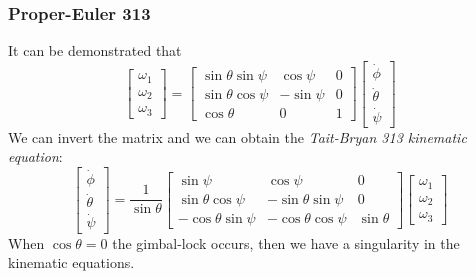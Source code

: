 \subsubsection{Proper-Euler 313}
It can be demonstrated that
\begin{equation}
        \begin{bmatrix}
            \omega_1\\
            \omega_2\\
            \omega_3
        \end{bmatrix} = 
        \begin{bmatrix}
           \sin\theta\sin\psi&\cos\psi&0\\
           \sin\theta\cos\psi&-\sin\psi&0\\
           \cos\theta&0&1
        \end{bmatrix}
        \begin{bmatrix}
            \dot{\phi}\\
            \dot{\theta}\\
            \dot{\psi}
        \end{bmatrix}
\end{equation}
We can invert the matrix and we can obtain the \textit{Tait-Bryan 313 kinematic equation}:
\begin{equation}
    \begin{bmatrix}
        \dot{\phi}\\
        \dot{\theta}\\
        \dot{\psi}
    \end{bmatrix}=\frac{1}{\sin\theta}\begin{bmatrix}
        \sin\psi&\cos\psi&0\\
        \sin\theta\cos\psi&-\sin\theta\sin\psi&0\\
        -\cos\theta\sin\psi&-\cos\theta\cos\psi&\sin\theta
    \end{bmatrix}\begin{bmatrix}
        \omega_1\\
        \omega_2\\
        \omega_3
    \end{bmatrix}
\end{equation}
When $\cos\theta=0$ the gimbal-lock occurs, then we have a singularity in the kinematic equations.

